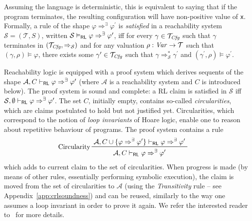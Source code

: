 Assuming the language is deterministic, this is equivalent to saying that if the program terminates,
the resulting configuration will have non-positive value of \texttt{x}.
Formally, a rule of the shape $\varphi \Rightarrow^\exists \varphi^\prime$
is \emph{satisfied}
in a reachability system $\mathcal{S} = (\mathcal{T}, S)$,
written $\mathcal{S} \vDash_{\mathsf{RL}} \varphi \Rightarrow^\exists \varphi^\prime$,
iff for every $\gamma \in \mathcal{T}_{\mathit{Cfg}}$
such that $\gamma$ terminates in $(\mathcal{T}_{\mathit{Cfg}}, \Rightarrow_{\mathcal{S}})$
and for any valuation $\rho : \mathit{Var} \to \mathcal{T}$
such that $(\gamma, \rho) \vDash \varphi$,
there exists some $\gamma^\prime \in \mathcal{T}_{\mathit{Cfg}}$
such that
$\gamma \Rightarrow^{*}_{\mathcal{S}} \gamma^\prime$
and $(\gamma^\prime, \rho) \vDash \varphi^\prime$.


Reachability logic is equipped with a proof system which derives sequents of the shape
$\mathcal{A}, C \vdash_{\mathsf{RL}} \varphi \Rightarrow^\exists \varphi^\prime$ (where $\mathcal{A}$ is a
reachability system and $C$ is introduced below). The proof system is sound and complete: a RL claim is satisfied in $\mathcal{S}$
iff $\mathcal{S}, \emptyset \vdash_{\mathsf{RL}} \varphi \Rightarrow^\exists \varphi^\prime$.
The set $C$, initially empty, contains so-called \emph{circularities},
which are claims postulated to hold but not justified yet.
Circularities, which correspond to the notion of \emph{loop invariants} of Hoare logic,
enable one to reason about repetitive behaviour of programs.
The proof system contains a rule
\begin{align*}
    & \prftree[l]{Circularity}
      { \mathcal{A}, C \cup \{ \varphi\Rightarrow^\exists \varphi^\prime \} \vdash_\RL \varphi \Rightarrow^\exists \varphi^\prime }
      { \mathcal{A}, C \vdash_\RL \varphi \Rightarrow^\exists \varphi^\prime }
\end{align*}
which adds to current claim to the set of circularities.  When progress is
made (by means of other rules, essentially performing symbolic execution),
the claim is moved from the set of circularities to $\mathcal{A}$ (using the
\emph{Transitivity} rule -- see Appendix~\ref{app:crlsoundness}) and can be
reused, similarly to the way one assumes a loop invariant in order to prove it
again.  We refer the interested reader to~\cite{RosuS12oopsla} for more
details.




